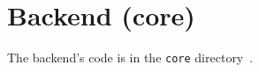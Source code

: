 \section{Backend (core)}\label{backend-core}

The backend's code is in the \texttt{core} directory~\cite{sewera_notipie_2022}.




